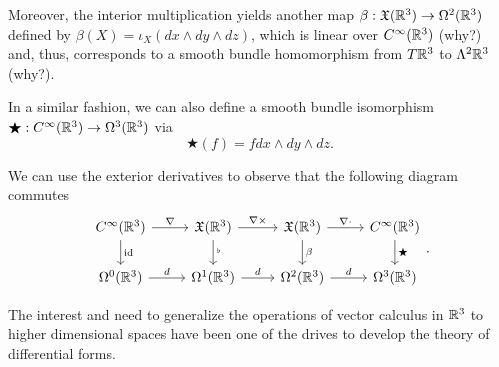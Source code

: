 \begin{example}
  Moreover, the interior multiplication yields another map $\beta: \mathfrak{X}(\mathbb{R}^3)\to\Omega^2(\mathbb{R}^3)$ defined by $\beta(X) = \iota_X (dx\wedge dy\wedge dz)$, which is linear over $C^\infty(\mathbb{R}^3)$ (why?) and, thus, corresponds to a smooth bundle homomorphism from $T\mathbb{R}^3$ to $\Lambda^2\mathbb{R}^3$ (why?).

  In a similar fashion, we can also define a smooth bundle isomorphism $\bigstar: C^\infty(\mathbb{R}^3) \to \Omega^3(\mathbb{R}^3)$ via
  \begin{equation}
    \bigstar(f) = f dx\wedge dy\wedge dz.
  \end{equation}

  We can use the exterior derivatives to observe that the following diagram commutes
  \begin{equation}\label{diag:comm:r3ops}
    \begin{tikzcd}
      C^\infty(\R^3) \arrow[d, "\id"] \arrow[r, "\nabla"] &
      \fX(\R^3) \arrow[d, "{}^\flat"] \arrow[r, "\nabla\times"] &
      \fX(\R^3) \arrow[d, "\beta"] \arrow[r, "\nabla\cdot"] &
      C^\infty(\R^3) \arrow[d, "\bigstar"] \\
      \Omega^0(\R^3) \arrow[r, "d"] &
      \Omega^1(\R^3) \arrow[r, "d"] &
      \Omega^2(\R^3) \arrow[r, "d"] &
      \Omega^3(\R^3)
    \end{tikzcd}.
  \end{equation}

  The interest and need to generalize the operations of vector calculus in $\mathbb{R}^3$ to higher dimensional spaces have been one of the drives to develop the theory of differential forms.


\end{example}

